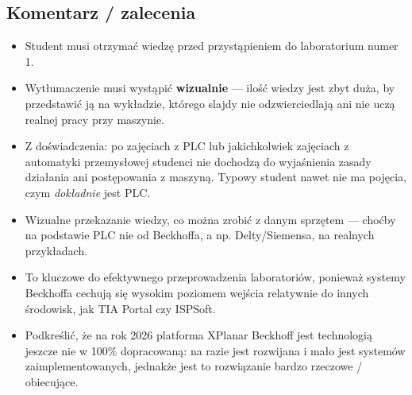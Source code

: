\documentclass[11pt,a4paper]{report}
\begin{document}
\subsection*{Komentarz / zalecenia}
\begin{itemize}
  \item Student musi otrzymać wiedzę przed przystąpieniem do laboratorium numer 1.
  \item Wytłumaczenie musi wystąpić \textbf{wizualnie} --- ilość wiedzy jest zbyt duża, by przedstawić ją na wykładzie, którego slajdy nie odzwierciedlają ani nie uczą realnej pracy przy maszynie.
  \item Z doświadczenia: po zajęciach z PLC lub jakichkolwiek zajęciach z automatyki przemysłowej studenci nie dochodzą do wyjaśnienia zasady działania ani postępowania z maszyną. Typowy student nawet nie ma pojęcia, czym \textit{dokładnie} jest PLC.
  \item Wizualne przekazanie wiedzy, co można zrobić z danym sprzętem --- choćby na podstawie PLC nie od Beckhoffa, a np. Delty/Siemensa, na realnych przykładach.
  \item To kluczowe do efektywnego przeprowadzenia laboratoriów, ponieważ systemy Beckhoffa cechują się wysokim poziomem wejścia relatywnie do innych środowisk, jak TIA Portal czy ISPSoft.
  \item Podkreślić, że na rok 2026 platforma XPlanar Beckhoff jest technologią jeszcze nie w 100\% dopracowaną: na razie jest rozwijana i mało jest systemów zaimplementowanych, jednakże jest to rozwiązanie bardzo rzeczowe / obiecujące.
\end{itemize}
\end{document}
